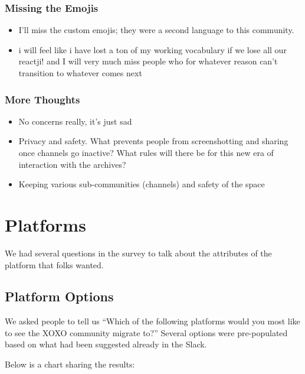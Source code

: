 \documentclass[
]{book}
\providecommand{\tightlist}{%
  \setlength{\itemsep}{0pt}\setlength{\parskip}{0pt}}
\begin{document}
\subsection{Missing the Emojis}\label{missing-the-emojis}

\begin{itemize}
\tightlist
\item
  I'll miss the custom emojis; they were a second language to this community.
\item
  i will feel like i have lost a ton of my working vocabulary if we lose all our reactji! and I will very much miss people who for whatever reason can't transition to whatever comes next
\end{itemize}

\subsection{More Thoughts}\label{more-thoughts}

\begin{itemize}
\tightlist
\item
  No concerns really, it's just sad
\item
  Privacy and safety. What prevents people from screenshotting and sharing once channels go inactive? What rules will there be for this new era of interaction with the archives?
\item
  Keeping various sub-communities (channels) and safety of the space
\end{itemize}

\chapter{Platforms}\label{platforms}

We had several questions in the survey to talk about the attributes of the platform that folks wanted.

\section{Platform Options}\label{platform-options}

We asked people to tell us ``Which of the following platforms would you most like to see the XOXO community migrate to?'' Several options were pre-populated based on what had been suggested already in the Slack.

Below is a chart sharing the results:
\end{document}
